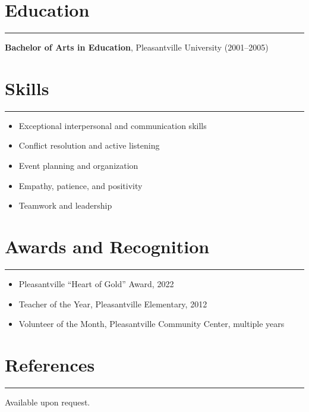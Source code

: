 \documentclass[11pt,a4paper]{article}
\begin{document}
\section*{Education}
\noindent\rule{\textwidth}{0.4pt}
\textbf{Bachelor of Arts in Education}, Pleasantville University (2001--2005)

\section*{Skills}
\noindent\rule{\textwidth}{0.4pt}
\begin{itemize}[leftmargin=*]
    \item Exceptional interpersonal and communication skills
    \item Conflict resolution and active listening
    \item Event planning and organization
    \item Empathy, patience, and positivity
    \item Teamwork and leadership
\end{itemize}

\section*{Awards and Recognition}
\noindent\rule{\textwidth}{0.4pt}
\begin{itemize}[leftmargin=*]
    \item Pleasantville ``Heart of Gold'' Award, 2022
    \item Teacher of the Year, Pleasantville Elementary, 2012
    \item Volunteer of the Month, Pleasantville Community Center, multiple years
\end{itemize}

\section*{References}
\noindent\rule{\textwidth}{0.4pt}
Available upon request.
\end{document}
